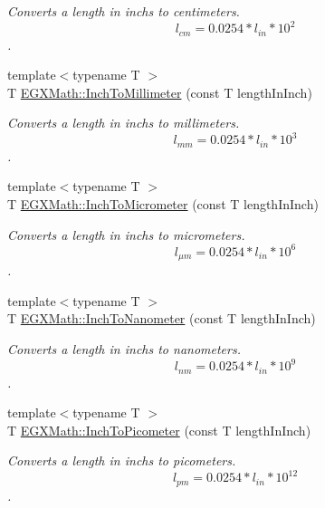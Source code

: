 \begin{DoxyCompactItemize}
\begin{DoxyCompactList}\small\item\em Converts a length in inchs to centimeters. \[ l_{cm}=0.0254 * l_{in} * 10^{2} \]. \end{DoxyCompactList}\item 
{\footnotesize template$<$typename T $>$ }\\T \mbox{\hyperlink{group___e_g_x_math-_conversions-_length_conversions-_imperial-_inch-_s_i_ga62adb6084de8b6ff26107bdfeb4144f2}{E\+G\+X\+Math\+::\+Inch\+To\+Millimeter}} (const T length\+In\+Inch)
\begin{DoxyCompactList}\small\item\em Converts a length in inchs to millimeters. \[ l_{mm}=0.0254 * l_{in} * 10^{3} \]. \end{DoxyCompactList}\item 
{\footnotesize template$<$typename T $>$ }\\T \mbox{\hyperlink{group___e_g_x_math-_conversions-_length_conversions-_imperial-_inch-_s_i_ga664100ea5f92f4e92686e217e996b475}{E\+G\+X\+Math\+::\+Inch\+To\+Micrometer}} (const T length\+In\+Inch)
\begin{DoxyCompactList}\small\item\em Converts a length in inchs to micrometers. \[ l_{\mu m}=0.0254 * l_{in} * 10^{6} \]. \end{DoxyCompactList}\item 
{\footnotesize template$<$typename T $>$ }\\T \mbox{\hyperlink{group___e_g_x_math-_conversions-_length_conversions-_imperial-_inch-_s_i_gac4c0a73502ca20ec1a44748725c333ad}{E\+G\+X\+Math\+::\+Inch\+To\+Nanometer}} (const T length\+In\+Inch)
\begin{DoxyCompactList}\small\item\em Converts a length in inchs to nanometers. \[ l_{nm}=0.0254 * l_{in} * 10^{9} \]. \end{DoxyCompactList}\item 
{\footnotesize template$<$typename T $>$ }\\T \mbox{\hyperlink{group___e_g_x_math-_conversions-_length_conversions-_imperial-_inch-_s_i_ga4220728877d0369e359689a0d8f8207c}{E\+G\+X\+Math\+::\+Inch\+To\+Picometer}} (const T length\+In\+Inch)
\begin{DoxyCompactList}\small\item\em Converts a length in inchs to picometers. \[ l_{pm}=0.0254 * l_{in} * 10^{12} \]. \end{DoxyCompactList}\item 

\end{DoxyCompactItemize}
